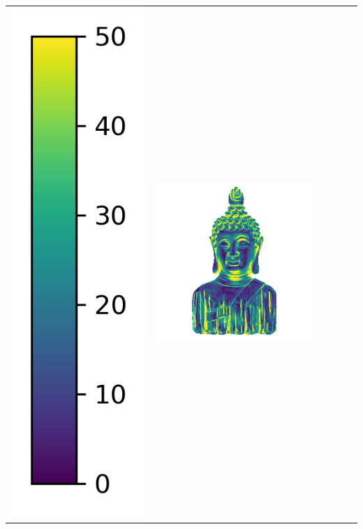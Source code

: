 \begin{center}
\begin{tabularx}{\linewidth}{@{}Y@{}Y@{}Y@{}Y@{}Y@{}Y@{}}
\includegraphics[width=0.2\linewidth]{semisynthetic/colorbar_error_vertical.png} &
\includegraphics[width=\linewidth]{semisynthetic/20160617_16_ours_err.png} &

\end{tabularx}
\end{center}
